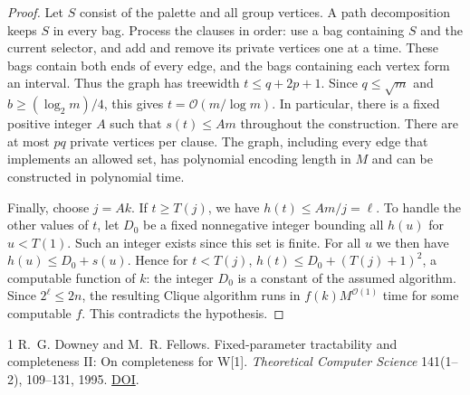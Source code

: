 \documentclass[11pt]{article}
\begin{document}
\begin{proof}
Let \(S\) consist of the palette and all group vertices. A path
decomposition keeps \(S\) in every bag. Process the clauses in order:
use a bag containing \(S\) and the current selector, and add and
remove its private vertices one at a time. These bags contain both
ends of every edge, and the bags containing each vertex form an
interval. Thus the graph has treewidth \(t\le q+2p+1\).
Since \(q\le\sqrt m\) and \(b\ge(\log_2 m)/4\), this gives
\(t=\mathcal O(m/\log m)\). In particular, there is a fixed positive
integer \(A\) such that \(s(t)\le A m\) throughout the construction.
There are at most \(pq\) private vertices per clause. The graph,
including every edge that implements an allowed set, has polynomial
encoding length in \(M\) and can be constructed in polynomial time.

Finally, choose \(j=Ak\). If \(t\ge T(j)\), we have
\(h(t)\le A m/j=\ell\). To handle the other values of \(t\), let \(D_0\)
be a fixed nonnegative integer bounding all \(h(u)\) for \(u<T(1)\).
Such an integer exists since this set is finite. For all \(u\) we
then have \(h(u)\le D_0+s(u)\). Hence for \(t<T(j)\),
\(h(t)\le D_0+(T(j)+1)^2\), a computable function of \(k\):
the integer \(D_0\) is a constant of the assumed algorithm.
Since \(2^\ell\le 2n\), the resulting Clique algorithm runs in
\(f(k)M^{\mathcal O(1)}\) time for some computable \(f\).
This contradicts the hypothesis.
\end{proof}

\begin{thebibliography}{1}
 R.~G. Downey and M.~R. Fellows.
Fixed-parameter tractability and completeness II: On completeness for W[1].
\emph{Theoretical Computer Science} 141(1--2), 109--131, 1995.
\href{https://doi.org/10.1016/0304-3975(94)00097-3}{DOI}.
\end{thebibliography}
\end{document}
